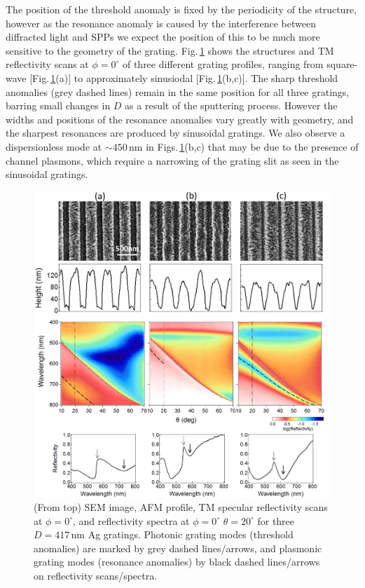 The position of the threshold anomaly is fixed by the periodicity of the structure, however as the resonance anomaly is caused by the interference between diffracted light and SPPs we expect the position of this to be much more sensitive to the geometry of the grating. Fig.\,\ref{7Fig10} shows the structures and TM reflectivity scans at $\phi=0^{\circ}$ of three different grating profiles, ranging from square-wave [Fig.\,\ref{7Fig10}(a)] to approximately sinusiodal [Fig.\,\ref{7Fig10}(b,c)]. The sharp threshold anomalies (grey dashed lines) remain in the same position for all three gratings, barring small changes in $D$ as a result of the sputtering process. However the widths and positions of the resonance anomalies vary greatly with geometry, and the sharpest resonances are produced by sinusoidal gratings. We also observe a dispersionless mode at $\sim450$\,nm in Figs.\,\ref{7Fig10}(b,c) that may be due to the presence of channel plasmons, which require a narrowing of the grating slit as seen in the sinusoidal gratings.
\begin{figure}[h!] 
\centering    
\includegraphics[width=\textwidth]{Fig10}
\caption[Effect of grating geometry on the optical spectra of $D=417$\,nm Ag gratings.] {(From top) SEM image, AFM profile, TM specular reflectivity scans at $\phi=0^{\circ}$, and reflectivity spectra at $\phi=0^{\circ}$ $\theta=20^{\circ}$ for three $D=417$\,nm Ag gratings. Photonic grating modes (threshold anomalies) are marked by grey dashed lines/arrows, and plasmonic grating modes (resonance anomalies) by black dashed lines/arrows on reflectivity scans/spectra.}
\label{7Fig10}
\end{figure}

